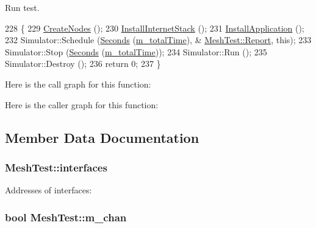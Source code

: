 Run test. 


\begin{DoxyCode}
228 \{
229   \hyperlink{classMeshTest_aa1eb18d555ebcf925e9bdc13e4e57ee0}{CreateNodes} ();
230   \hyperlink{classMeshTest_a43bfeb98362be8a2d7d16f49939e4ea5}{InstallInternetStack} ();
231   \hyperlink{classMeshTest_af3cc96a4ae76dc2de2909d19817e6c64}{InstallApplication} ();
232   Simulator::Schedule (\hyperlink{group__timecivil_ga33c34b816f8ff6628e33d5c8e9713b9e}{Seconds} (\hyperlink{classMeshTest_af34b52e88b6f15ad05dc07788e53e35b}{m\_totalTime}), &
      \hyperlink{classMeshTest_aceb70a8a164043db7a4249e239d07841}{MeshTest::Report}, \textcolor{keyword}{this});
233   Simulator::Stop (\hyperlink{group__timecivil_ga33c34b816f8ff6628e33d5c8e9713b9e}{Seconds} (\hyperlink{classMeshTest_af34b52e88b6f15ad05dc07788e53e35b}{m\_totalTime}));
234   Simulator::Run ();
235   Simulator::Destroy ();
236   \textcolor{keywordflow}{return} 0;
237 \}
\end{DoxyCode}


Here is the call graph for this function\+:




Here is the caller graph for this function\+:




\subsection{Member Data Documentation}
\subsubsection[{\texorpdfstring{interfaces}{interfaces}}]{ Mesh\+Test\+::interfaces\hspace{0.3cm}{\ttfamily [private]}}\hypertarget{classMeshTest_a5dc8fc0fede852feb6bf27788e8f19ee}{}\label{classMeshTest_a5dc8fc0fede852feb6bf27788e8f19ee}


Addresses of interfaces\+: 

\subsubsection[{\texorpdfstring{m\+\_\+chan}{m_chan}}]{\setlength{\rightskip}{0pt plus 5cm}bool Mesh\+Test\+::m\+\_\+chan\hspace{0.3cm}{\ttfamily [private]}}\hypertarget{classMeshTest_ad0d36545a05da5c3139efffbe973a636}{}\label{classMeshTest_ad0d36545a05da5c3139efffbe973a636}


